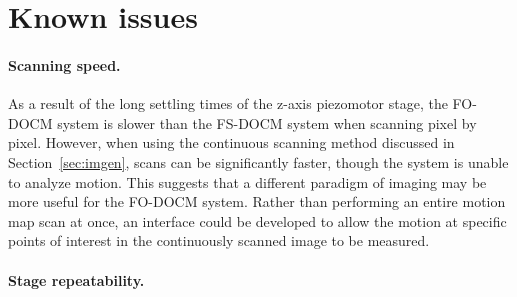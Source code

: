 

\section{Known issues}
\label{sec:known_issues}

\paragraph{Scanning speed.}

As a result of the long settling times of the z-axis piezomotor stage, the FO-DOCM system is slower than the FS-DOCM system when scanning pixel by pixel. However, when using the continuous scanning method discussed in Section~\ref{sec:imgen}, scans can be significantly faster, though the system is unable to analyze motion. This suggests that a different paradigm of imaging may be more useful for the FO-DOCM system. Rather than performing an entire motion map scan at once, an interface could be developed to allow the motion at specific points of interest in the continuously scanned image to be measured.


\paragraph{Stage repeatability.}

